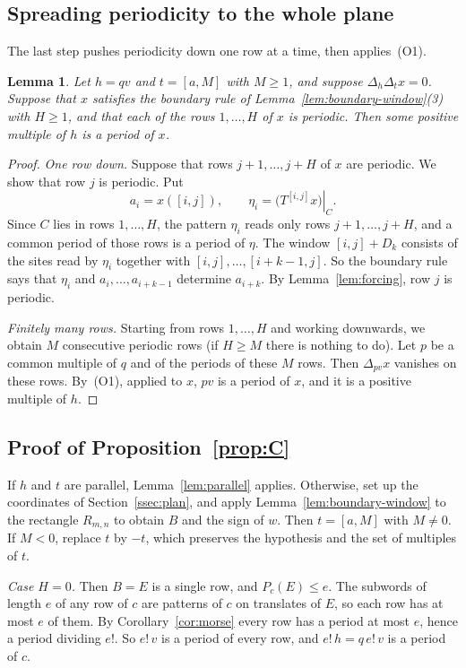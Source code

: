 \documentclass[11pt,a4paper,reqno]{amsart}
\newtheorem{lemma}[theorem]{Lemma}
\theoremstyle{definition}
\theoremstyle{remark}
\newcommand{\De}{\Delta}
\newcommand{\restr}[2]{\left.#1\right|_{#2}}
\newcommand{\rc}[2]{[#1,#2]}
\numberwithin{equation}{section}
\begin{document}
\subsection{Spreading periodicity to the whole plane}
The last step pushes periodicity down one row at a time, then applies~(O1).

\begin{lemma}\label{lem:row-lifting}
Let $h=qv$ and $t=\rc aM$ with $M\ge1$, and suppose $\De_h\De_tx=0$. Suppose that $x$ satisfies the boundary rule of Lemma~\ref{lem:boundary-window}(3) with $H\ge1$, and that each of the rows $1,\ldots,H$ of $x$ is periodic. Then some positive multiple of $h$ is a period of $x$.
\end{lemma}

\begin{proof}
\emph{One row down.} Suppose that rows $j+1,\ldots,j+H$ of $x$ are periodic. We show that row $j$ is periodic. Put
\[
 a_i=x(\rc ij),\qquad \eta_i=\restr{\bigl(T^{\rc ij}x\bigr)}{C}.
\]
Since $C$ lies in rows $1,\ldots,H$, the pattern $\eta_i$ reads only rows $j+1,\ldots,j+H$, and a common period of those rows is a period of $\eta$. The window $\rc ij+D_k$ consists of the sites read by $\eta_i$ together with $\rc ij,\ldots,\rc{i+k-1}j$. So the boundary rule says that $\eta_i$ and $a_i,\ldots,a_{i+k-1}$ determine $a_{i+k}$. By Lemma~\ref{lem:forcing}, row $j$ is periodic.

\emph{Finitely many rows.} Starting from rows $1,\ldots,H$ and working downwards, we obtain $M$ consecutive periodic rows (if $H\ge M$ there is nothing to do). Let $p$ be a common multiple of $q$ and of the periods of these $M$ rows. Then $\De_{pv}x$ vanishes on these rows. By~(O1), applied to $x$, $pv$ is a period of $x$, and it is a positive multiple of $h$.
\end{proof}

\subsection{Proof of Proposition~\ref{prop:C}}
If $h$ and $t$ are parallel, Lemma~\ref{lem:parallel} applies. Otherwise, set up the coordinates of Section~\ref{ssec:plan}, and apply Lemma~\ref{lem:boundary-window} to the rectangle $R_{m,n}$ to obtain $B$ and the sign of $w$. Then $t=\rc aM$ with $M\ne0$. If $M<0$, replace $t$ by $-t$, which preserves the hypothesis and the set of multiples of $t$.

\emph{Case $H=0$.} Then $B=E$ is a single row, and $P_c(E)\le e$. The subwords of length $e$ of any row of $c$ are patterns of $c$ on translates of $E$, so each row has at most $e$ of them. By Corollary~\ref{cor:morse} every row has a period at most $e$, hence a period dividing $e!$. So $e!\,v$ is a period of every row, and $e!\,h=q\,e!\,v$ is a period of $c$.
\end{document}
